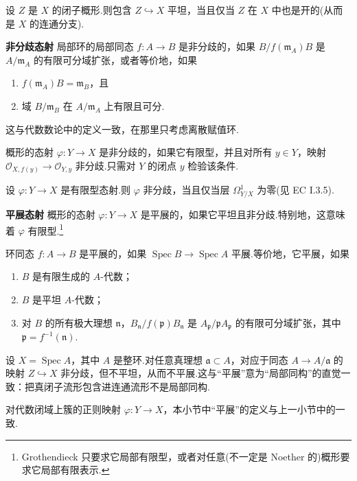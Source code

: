 设 $Z$ 是 $X$ 的闭子概形.则包含 $Z \hookrightarrow X$ 平坦，当且仅当 $Z$ 在 $X$ 中也是开的(从而是 $X$ 的连通分支).

\textbf{非分歧态射} 局部环的局部同态 $f \colon A \to B$ 是非分歧的，如果 $B/f(\mathfrak{m}_{A})B$ 是 $A/\mathfrak{m}_{A}$ 的有限可分域扩张，或者等价地，如果
\begin{enumerate}
  \item $f(\mathfrak{m}_{A})B = \mathfrak{m}_{B}$，且
  \item 域 $B/\mathfrak{m}_{B}$ 在 $A/\mathfrak{m}_{A}$ 上有限且可分.
\end{enumerate}
这与代数数论中的定义一致，在那里只考虑离散赋值环.

概形的态射 $\varphi \colon Y \to X$ 是非分歧的，如果它有限型，并且对所有 $y \in Y$，映射 $\mathcal{O}_{X, f(y)} \to \mathcal{O}_{Y, y}$ 非分歧.只需对 $Y$ 的闭点 $y$ 检验该条件.

设 $\varphi \colon Y \to X$ 是有限型态射.则 $\varphi$ 非分歧，当且仅当层 $\Omega^{1}_{Y/X}$ 为零(见 EC I.3.5).

\textbf{平展态射} 概形的态射 $\varphi \colon Y \to X$ 是平展的，如果它平坦且非分歧.特别地，这意味着 $\varphi$ 有限型.\footnote{Grothendieck 只要求它局部有限型，或者对任意(不一定是 Noether 的)概形要求它局部有限表示.}

环同态 $f \colon A \to B$ 是平展的，如果 $\operatorname{Spec} B \to \operatorname{Spec} A$ 平展.等价地，它平展，如果
\begin{enumerate}
  \item $B$ 是有限生成的 $A$-代数；
  \item $B$ 是平坦 $A$-代数；
  \item 对 $B$ 的所有极大理想 $\mathfrak{n}$，$B_{\mathfrak{n}}/f(\mathfrak{p})B_{\mathfrak{n}}$ 是 $A_{\mathfrak{p}}/\mathfrak{p}A_{\mathfrak{p}}$ 的有限可分域扩张，其中 $\mathfrak{p} = f^{-1}(\mathfrak{n})$.
\end{enumerate}

设 $X = \operatorname{Spec} A$，其中 $A$ 是整环.对任意真理想 $\mathfrak{a} \subset A$，对应于同态 $A \to A/\mathfrak{a}$ 的映射 $Z \hookrightarrow X$ 非分歧，但不平坦，从而不平展.这与``平展''意为``局部同构''的直觉一致：把真闭子流形包含进连通流形不是局部同构.

\begin{proposition}\label{prop:2.9}
对代数闭域上簇的正则映射 $\varphi \colon Y \to X$，本小节中``平展''的定义与上一小节中的一致.
\end{proposition}


